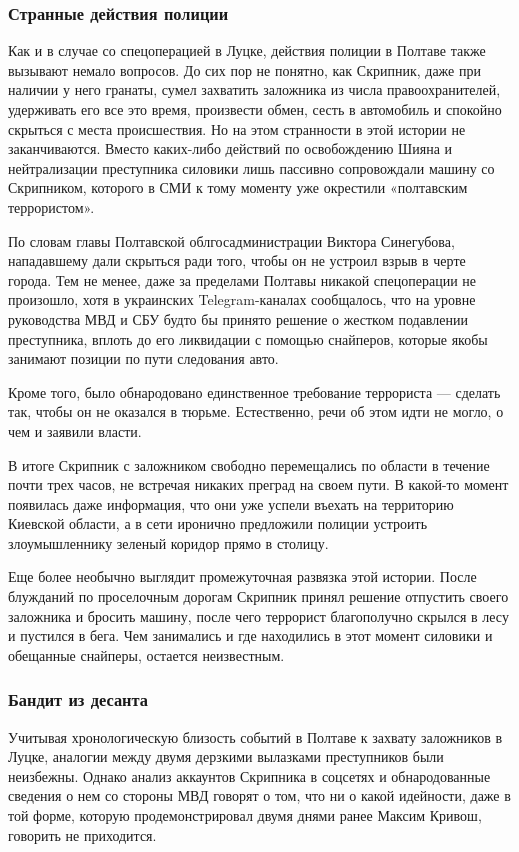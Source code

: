\subsubsection{Странные действия полиции}

Как и в случае со спецоперацией в Луцке, действия полиции в Полтаве также
вызывают немало вопросов. До сих пор не понятно, как Скрипник, даже при наличии
у него гранаты, сумел захватить заложника из числа правоохранителей, удерживать
его все это время, произвести обмен, сесть в автомобиль и спокойно скрыться с
места происшествия.  Но на этом странности в этой истории не заканчиваются.
Вместо каких-либо действий по освобождению Шияна и нейтрализации преступника
силовики лишь пассивно сопровождали машину со Скрипником, которого в СМИ к тому
моменту уже окрестили «полтавским террористом».

По словам главы Полтавской облгосадминистрации Виктора Синегубова, нападавшему
дали скрыться ради того, чтобы он не устроил взрыв в черте города. Тем не
менее, даже за пределами Полтавы никакой спецоперации не произошло, хотя в
украинских Telegram-каналах сообщалось, что на уровне руководства МВД и СБУ
будто бы принято решение о жестком подавлении преступника, вплоть до его
ликвидации с помощью снайперов, которые якобы занимают позиции по пути
следования авто.

Кроме того, было обнародовано единственное требование террориста --- сделать так,
чтобы он не оказался в тюрьме. Естественно, речи об этом идти не могло, о чем и
заявили власти.

В итоге Скрипник с заложником свободно перемещались по области в течение почти
трех часов, не встречая никаких преград на своем пути. В какой-то момент
появилась даже информация, что они уже успели въехать на территорию Киевской
области, а в сети иронично предложили полиции устроить злоумышленнику зеленый
коридор прямо в столицу.

Еще более необычно выглядит промежуточная развязка этой истории. После
блужданий по проселочным дорогам Скрипник принял решение отпустить своего
заложника и бросить машину, после чего террорист благополучно скрылся в лесу и
пустился в бега. Чем занимались и где находились в этот момент силовики и
обещанные снайперы, остается неизвестным. 

\subsubsection{Бандит из десанта}

Учитывая хронологическую близость событий в Полтаве к захвату заложников в
Луцке, аналогии между двумя дерзкими вылазками преступников были неизбежны.
Однако анализ аккаунтов Скрипника в соцсетях и обнародованные сведения о нем со
стороны МВД говорят о том, что ни о какой идейности, даже в той форме, которую
продемонстрировал двумя днями ранее Максим Кривош, говорить не приходится.

